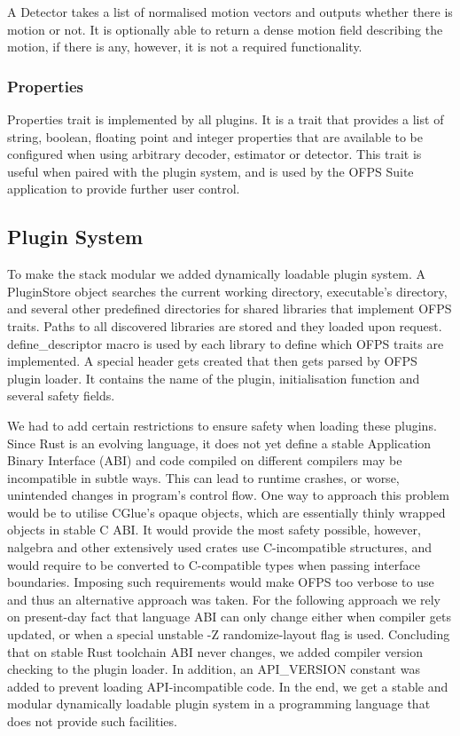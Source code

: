 \documentclass[11pt,english]{report}
\begin{document}
A Detector takes a list of normalised motion vectors and outputs whether there is motion or not. It is optionally able to return a dense motion field describing the motion, if there is any, however, it is not a required functionality.

\subsubsection{Properties}

Properties trait is implemented by all plugins. It is a trait that provides a list of string, boolean, floating point and integer properties that are available to be configured when using arbitrary decoder, estimator or detector. This trait is useful when paired with the plugin system, and is used by the OFPS Suite application to provide further user control.

\subsection{Plugin System}

To make the stack modular we added dynamically loadable plugin system. A PluginStore object searches the current working directory, executable's directory, and several other predefined directories for shared libraries that implement OFPS traits. Paths to all discovered libraries are stored and they loaded upon request. define\_descriptor macro is used by each library to define which OFPS traits are implemented. A special header gets created that then gets parsed by OFPS plugin loader. It contains the name of the plugin, initialisation function and several safety fields.

We had to add certain restrictions to ensure safety when loading these plugins. Since Rust is an evolving language, it does not yet define a stable Application Binary Interface (ABI)\cite{abi-ip} and code compiled on different compilers may be incompatible in subtle ways. This can lead to runtime crashes, or worse, unintended changes in program's control flow. One way to approach this problem would be to utilise CGlue's opaque objects\cite{cglue}, which are essentially thinly wrapped objects in stable C ABI. It would provide the most safety possible, however, nalgebra and other extensively used crates use C-incompatible structures, and would require to be converted to C-compatible types when passing interface boundaries. Imposing such requirements would make OFPS too verbose to use and thus an alternative approach was taken. For the following approach we rely on present-day fact that language ABI can only change either when compiler gets updated, or when a special unstable -Z randomize-layout\cite{randomize-layout} flag is used. Concluding that on stable Rust toolchain ABI never changes, we added compiler version checking to the plugin loader. In addition, an API\_VERSION constant was added to prevent loading API-incompatible code. In the end, we get a stable and modular dynamically loadable plugin system in a programming language that does not provide such facilities.
\end{document}
